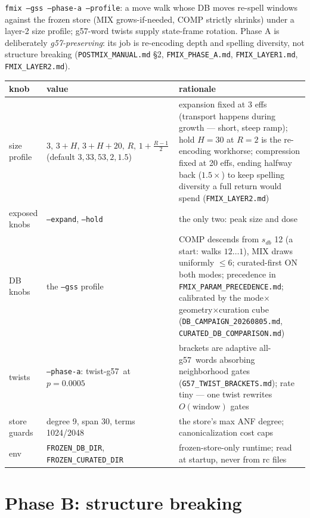 \documentclass[11pt]{article}
\newcommand{\g}{\textsf{g57}}
\newcommand{\doc}[1]{\texttt{#1}}
\begin{document}
\texttt{fmix --gss --phase-a --profile}: a move walk whose DB moves
re-spell windows against the frozen store (MIX grows-if-needed, COMP
strictly shrinks) under a layer-2 size profile; \g-word twists supply
state-frame rotation. Phase A is deliberately \emph{\g-preserving}: its
job is re-encoding depth and spelling diversity, not structure breaking
(\doc{POSTMIX\_MANUAL.md} \S2, \doc{FMIX\_PHASE\_A.md},
\doc{FMIX\_LAYER1.md}, \doc{FMIX\_LAYER2.md}).

\begin{table}[H]\small
\begin{tabular}{L{3.2cm} L{4.2cm} L{7.2cm}}
\toprule
knob & value & rationale \\
\midrule
size profile & $3,\,3{+}H,\,3{+}H{+}20,\,R,\,1{+}\frac{R-1}{2}$ (default $3,33,53,2,1.5$) & expansion fixed at 3 effs (transport happens during growth --- short, steep ramp); hold $H{=}30$ at $R{=}2$ is the re-encoding workhorse; compression fixed at 20 effs, ending halfway back ($1.5\times$) to keep spelling diversity a full return would spend (\doc{FMIX\_LAYER2.md}) \\
exposed knobs & \texttt{--expand}, \texttt{--hold} & the only two: peak size and dose \\
DB knobs & the \texttt{--gss} profile & COMP descends from $s_{db}$ 12 (a start: walks $12\ldots1$), MIX draws uniformly $\le 6$; curated-first ON both modes; precedence in \doc{FMIX\_PARAM\_PRECEDENCE.md}; calibrated by the mode$\times$geometry$\times$curation cube (\doc{DB\_CAMPAIGN\_20260805.md}, \doc{CURATED\_DB\_COMPARISON.md}) \\
twists & \texttt{--phase-a}: twist-\g\ at $p=0.0005$ & brackets are adaptive all-\g\ words absorbing neighborhood gates (\doc{G57\_TWIST\_BRACKETS.md}); rate tiny --- one twist rewrites $O(\mathrm{window})$ gates \\
store guards & degree 9, span 30, terms 1024/2048 & the store's max ANF degree; canonicalization cost caps \\
env & \texttt{FROZEN\_DB\_DIR}, \texttt{FROZEN\_CURATED\_DIR} & frozen-store-only runtime; read at startup, never from rc files \\
\bottomrule
\end{tabular}
\end{table}

\section{Phase B: structure breaking}
\end{document}
